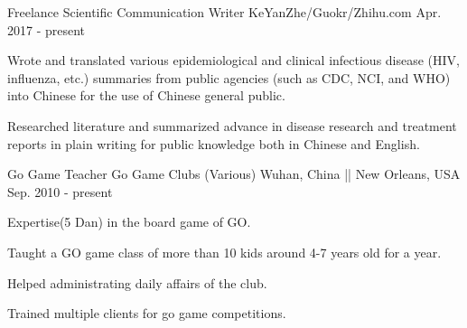 

\begin{cventries}

  \cventry
    {Freelance Scientific Communication Writer} %
    {KeYanZhe/Guokr/Zhihu.com} %
    {} %
    {Apr. 2017 - present} %
    {
      \begin{cvitems} %
        \item {Wrote and translated various epidemiological and clinical infectious disease (HIV, influenza, etc.) summaries from public agencies (such as CDC, NCI, and WHO) into Chinese for the use of Chinese general public.}
        \item {Researched literature and summarized advance in disease research and treatment reports in plain writing for public knowledge both in Chinese and English.}
      \end{cvitems}
    }



  \cventry
    {Go Game Teacher} %
    {Go Game Clubs (Various)} %
    {Wuhan, China || New Orleans, USA} %
    {Sep. 2010 - present} %
    {
      \begin{cvitems} %
        \item {Expertise(5 Dan) in the board game of GO.}
        \item {Taught a GO game class of more than 10 kids around 4-7 years old for a year.}
        \item {Helped administrating daily affairs of the club.}
        \item {Trained multiple clients for go game competitions.}
      \end{cvitems}
    }

\end{cventries}